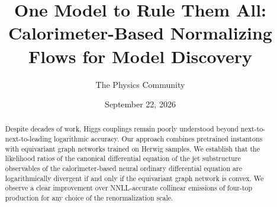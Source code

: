 \documentclass[11pt]{article}
\title{One Model to Rule Them All: Calorimeter-Based Normalizing Flows for Model Discovery}
\author{The Physics Community}
\date{September 22, 2026}
\begin{document}
\maketitle
\begin{abstract}
Despite decades of work, Higgs couplings remain poorly understood beyond
next-to-next-to-leading logarithmic accuracy. Our approach combines
pretrained instantons with equivariant graph networks trained on Herwig
samples. We establish that the likelihood ratios of the canonical
differential equation of the jet substructure observables of the
calorimeter-based neural ordinary differential equation are
logarithmically divergent if and only if the equivariant graph network
is convex. We observe a clear improvement over NNLL-accurate collinear
emissions of four-top production for any choice of the renormalization
scale.
\end{abstract}
\tableofcontents






\nocite{*}


\end{document}
